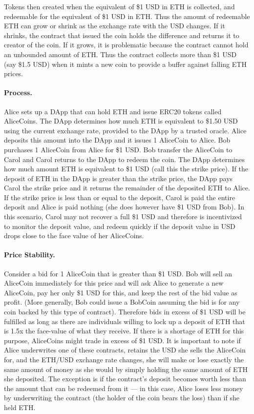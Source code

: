Tokens then created when the equivalent of \$1 USD in ETH is collected, and redeemable for the equivalent of \$1 USD in ETH. Thus the amount of redeemable ETH can grow or shrink as the exchange rate with the USD changes. If it shrinks, the contract that issued the coin holds the difference and returns it to creator of the coin. If it grows, it is problematic because the contract cannot hold an unbounded amount of ETH. Thus the contract collects more than \$1 USD (say \$1.5 USD) when it mints a new coin to provide a buffer against falling ETH prices.

\paragraph{Process.} Alice sets up a DApp that can hold ETH and issue ERC20 tokens called AliceCoins. The DApp determines how much ETH is equivalent to \$1.50 USD using the current exchange rate, provided to the DApp by a trusted oracle. Alice deposits this amount into the DApp and it issues 1 AliceCoin to Alice. Bob purchases 1 AliceCoin from Alice for \$1 USD. Bob transfer the AliceCoin to Carol and Carol returns to the DApp to redeem the coin. The DApp determines how much amount ETH is equivalent to \$1 USD (call this the strike price). If the deposit of ETH in the DApp is greater than the strike price, the DApp pays Carol the strike price and it returns the remainder of the deposited ETH to Alice. If the strike price is less than or equal to the deposit, Carol is paid the entire deposit and Alice is paid nothing (she does however have \$1 USD from Bob). In this scenario, Carol may not recover a full \$1 USD and therefore is incentivized to monitor the deposit value, and redeem quickly if the deposit value in USD drops close to the face value of her AliceCoins.

\paragraph{Price Stability.} Consider a bid for 1 AliceCoin that is greater than \$1 USD. Bob will sell an AliceCoin immediately for this price and will ask Alice to generate a new AliceCoin, pay her only \$1 USD for this, and keep the rest of the bid value as profit. (More generally, Bob could issue a BobCoin assuming the bid is for any coin backed by this type of contract). Therefore bids in excess of \$1 USD will be fulfilled as long as there are individuals willing to lock up a deposit of ETH that is 1.5x the face-value of what they receive. If there is a shortage of ETH for this purpose, AliceCoins might trade in excess of \$1 USD. It is important to note if Alice underwrites one of these contracts, retains the USD she sells the AliceCoin for, and the ETH/USD exchange rate changes, she will make or lose exactly the same amount of money as she would by simply holding the same amount of ETH she deposited. The exception is if the contract's deposit becomes worth less than the amount that can be redeemed from it --- in this case, Alice loses less money by underwriting the contract (the holder of the coin bears the loss) than if she held ETH.

